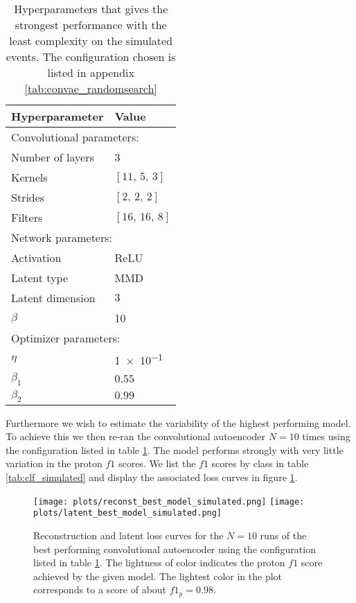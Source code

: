 \begin{table}
\centering
\caption{Hyperparameters that gives the strongest performance with the least complexity on the simulated events. The configuration chosen is listed in appendix \ref{tab:convae_randomsearch}}\label{tab:param_vals_sim_convae}
\setlength{\extrarowheight}{15pt}
\hspace*{-0.5in}
\begin{tabular}{ll}
\toprule
Hyperparameter & Value \\
\midrule
\multicolumn{2}{l}{Convolutional parameters: } \\
\midrule
Number of layers & 3\\
Kernels & $[11,\, 5,\, 3]$\\
Strides & $[2,\, 2,\, 2]$\\
Filters & $[16,\, 16,\, 8]$ \\ 
\midrule
\multicolumn{2}{l}{Network parameters: } \\
\midrule
Activation & ReLU \\
Latent type & MMD \\
Latent dimension & $3$ \\
$\beta$ & \num{10} \\
\midrule
\multicolumn{2}{l}{Optimizer parameters: } \\
\midrule
$\eta$ &  \num{1e-1} \\
$\beta_1$ & $0.55$ \\
$\beta_2$ & $0.99$ \\
\bottomrule
\end{tabular}
\end{table}

Furthermore we wish to estimate the variability of the highest performing model. To achieve this we then re-ran the convolutional autoencoder $N=10$ times using the configuration listed in table \ref{tab:param_vals_sim_convae}. The model performs strongly with very little variation in the proton $f1$ scores. We list the $f1$ scores by class in table \ref{tab:clf_simulated} and display the associated loss curves in figure \ref{fig:best_model_sim_clf}.

\begin{figure}[H]
\centering
\texttt{[image: plots/reconst\_best\_model\_simulated.png]}
\texttt{[image: plots/latent\_best\_model\_simulated.png]}
\caption[$L_x$ and $L_z$ for the CONV-AE on simulated AT-TPC data]{Reconstruction and latent loss curves for the $N=10$ runs of the best performing convolutional autoencoder using the configuration listed in table \ref{tab:param_vals_sim_convae}. The lightness of color indicates the proton $f1$ score achieved by the given model. The lightest color in the plot corresponds to a score of about $f1_p = 0.98$.}\label{fig:best_model_sim_clf}
\end{figure}

